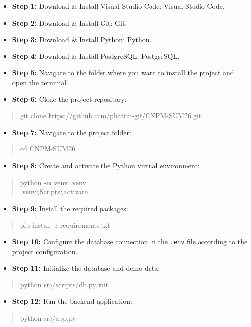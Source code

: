 \begin{itemize}[leftmargin=1.5em, nosep]
    \item \textbf{Step 1:} Download \& Install Visual Studio Code: Visual Studio Code.
    \item \textbf{Step 2:} Download \& Install Git: Git.
    \item \textbf{Step 3:} Download \& Install Python: Python.
    \item \textbf{Step 4:} Download \& Install PostgreSQL: PostgreSQL.
    \item \textbf{Step 5:} Navigate to the folder where you want to install the project and open the terminal.
    \item \textbf{Step 6:} Clone the project repository:
\end{itemize}
\begin{quote}\ttfamily
 git clone https://github.com/phattai-gif/CNPM-SUM26.git
\end{quote}
\begin{itemize}[leftmargin=1.5em, nosep]
    \item \textbf{Step 7:} Navigate to the project folder:
\end{itemize}
\begin{quote}\ttfamily
 cd CNPM-SUM26
\end{quote}
\begin{itemize}[leftmargin=1.5em, nosep]
    \item \textbf{Step 8:} Create and activate the Python virtual environment:
\end{itemize}
\begin{quote}\ttfamily
 python -m venv .venv\\
 .venv\textbackslash{}Scripts\textbackslash{}activate
\end{quote}
\begin{itemize}[leftmargin=1.5em, nosep]
    \item \textbf{Step 9:} Install the required packages:
\end{itemize}
\begin{quote}\ttfamily
 pip install -r requirements.txt
\end{quote}
\begin{itemize}[leftmargin=1.5em, nosep]
    \item \textbf{Step 10:} Configure the database connection in the \texttt{.env} file according to the project configuration.
    \item \textbf{Step 11:} Initialize the database and demo data:
\end{itemize}
\begin{quote}\ttfamily
 python src/scripts/db.py init
\end{quote}
\begin{itemize}[leftmargin=1.5em, nosep]
    \item \textbf{Step 12:} Run the backend application:
\end{itemize}
\begin{quote}\ttfamily
 python src/app.py
\end{quote}

